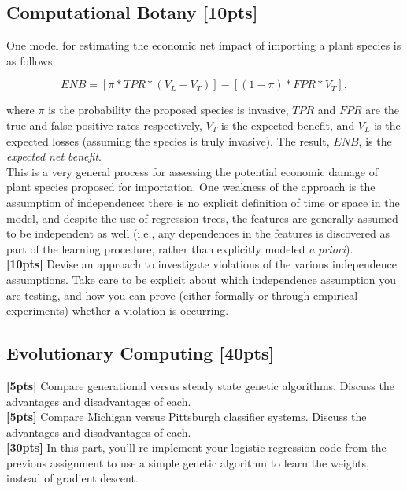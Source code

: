 \documentclass[paper=a4, fontsize=11pt]{scrartcl} %
\numberwithin{figure}{section} %
\numberwithin{table}{section} %
\begin{document}
\subsection{Computational Botany \textbf{[10pts]}}

One model for estimating the economic net impact of importing a plant species is as follows:

$$
ENB = \left[ \pi * TPR * (V_L - V_T) \right] - \left[ (1 - \pi) * FPR * V_T \right],
$$

where $\pi$ is the probability the proposed species is invasive, $TPR$ and $FPR$ are the true and false positive rates respectively, $V_T$ is the expected benefit, and $V_L$ is the expected losses (assuming the species is truly invasive). The result, $ENB$, is the \emph{expected net benefit}. \\

This is a very general process for assessing the potential economic damage of plant species proposed for importation. One weakness of the approach is the assumption of independence: there is no explicit definition of time or space in the model, and despite the use of regression trees, the features are generally assumed to be independent as well (i.e., any dependences in the features is discovered as part of the learning procedure, rather than explicitly modeled \emph{a priori}). \\

\textbf{[10pts]} Devise an approach to investigate violations of the various independence assumptions. Take care to be explicit about which independence assumption you are testing, and how you can prove (either formally or through empirical experiments) whether a violation is occurring.

\subsection{Evolutionary Computing \textbf{[40pts]}}

\textbf{[5pts]} Compare generational versus steady state genetic algorithms. Discuss the advantages and disadvantages of each. \\

\textbf{[5pts]} Compare Michigan versus Pittsburgh classifier systems. Discuss the advantages and disadvantages of each. \\

\textbf{[30pts]} In this part, you'll re-implement your logistic regression code from the previous assignment to use a simple genetic algorithm to learn the weights, instead of gradient descent. \\
\end{document}
